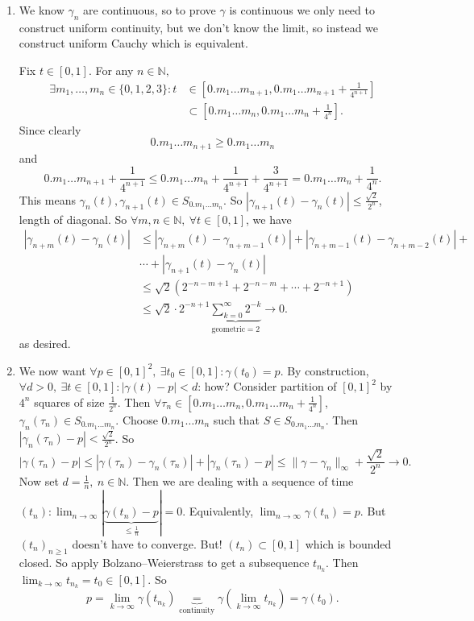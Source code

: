 \documentclass[a4paper]{article}
\theoremstyle{definition}
\begin{document}
\begin{enumerate}
    \item We know $\gamma_n$ are continuous, so to prove $\gamma$ is continuous we only need to construct uniform continuity, but we don't know the limit, so instead we construct uniform Cauchy which is equivalent.
    
    Fix $t\in [0,1]$. For any $n\in \mathbb N,$
    \[
    \begin{aligned}
    \exists m_1,\ldots,m_n \in \{0,1,2,3\} : t&\in \left[0.m_1\ldots m_{n+1},0.m_1\ldots m_{n+1} + \frac{1}{4^{n+1}} \right] \\&\subset \left[0.m_1\ldots m_{n},0.m_1\ldots m_{n} + \frac{1}{4^{n}} \right] .
    \end{aligned}
    \]
    Since clearly
    \[
    0.m_1\ldots m_{n+1}\geq 0.m_1\ldots m_n
    \]
    and
    \[
    0.m_1\ldots m_{n+1} + \frac{1}{4^{n+1}}\leq 0.m_1\ldots m_n + \frac{1}{4^{n+1}} +\frac{3}{4^{n+1}} = 0.m_1\ldots m_n + \frac{1}{4^n}.
    \]
    This means $\gamma_n(t),\gamma_{n+1}(t) \in S_{0.m_1\ldots m_n}$. So $|\gamma_{n+1}(t)-\gamma_n(t)|\leq \frac{\sqrt 2}{2^n}$, length of diagonal. So $\forall m,n \in \mathbb N,\ \forall t\in [0,1]$, we have
    \[
    \begin{aligned}
    |\gamma_{n+m}(t)-\gamma_n(t)| &\leq |\gamma_{n+m}(t)-\gamma_{n+m-1}(t)|+|\gamma_{n+m-1}(t)-\gamma_{n+m-2}(t)|+\\& \cdots+|\gamma_{n+1}(t)-\gamma_n (t)| \\&\leq \sqrt 2 \left(2^{-n-m+1}+2^{-n-m}+\cdots + 2^{-n+1}\right) \\& \leq \sqrt 2 \cdot 2^{-n+1} \underbrace{\sum_{k=0}^\infty 2^{-k}}_{\text{geometric}=2} \rightarrow 0.
    \end{aligned}
    \]
    as desired.
    \item We now want $\forall p\in [0,1]^2,\ \exists t_0 \in [0,1]:\gamma(t_0)=p$. By construction, $\forall d>0,\ \exists t\in [0,1] : |\gamma(t)-p|<d$: how? Consider partition of $[0,1]^2$ by $4^n$ squares of size $\frac{1}{2^n}$. Then $\forall \tau_n \in \left[0.m_1\ldots m_n, 0.m_1\ldots m_n+\frac{1}{4^n} \right]$, $\gamma_n(\tau_n)\in S_{0.m_1\ldots m_n}$. Choose $0.m_1\ldots m_n$ such that $S\in S_{0.m_1\ldots m_n}$. Then $|\gamma_n (\tau_n)-p|<\frac{\sqrt 2}{2^n}$. So
    \[
    |\gamma(\tau_n)-p| \leq |\gamma(\tau_n)-\gamma_n(\tau_n)|+|\gamma_n(\tau_n)-p| \leq \|\gamma-\gamma_n\|_\infty + \frac{\sqrt 2}{2^n} \rightarrow 0.
    \]
    Now set $d=\frac1n,\ n\in \mathbb N$. Then we are dealing with a sequence of time $(t_n):\lim_{n\rightarrow \infty} |\underbrace{\gamma(t_n)-p}_{\leq \frac1n}|=0.$ Equivalently, $\displaystyle \lim_{n\rightarrow \infty} \gamma(t_n)=p$. But $(t_n)_{n\geq 1}$ doesn't have to converge. But! $(t_n) \subset [0,1]$ which is bounded closed. So apply Bolzano–Weierstrass to get a subsequence $t_{n_k}$. Then $\displaystyle \lim_{k\rightarrow \infty} t_{n_k}=t_0 \in [0,1]$. So
    \[
    p=\lim_{k\rightarrow \infty} \gamma\left(t_{n_k}\right) \underbrace{=}_{\text{continuity}}\gamma\left(\lim_{k\rightarrow \infty} t_{n_k}\right)=\gamma(t_0) .
    \]
\end{enumerate}
\end{document}
